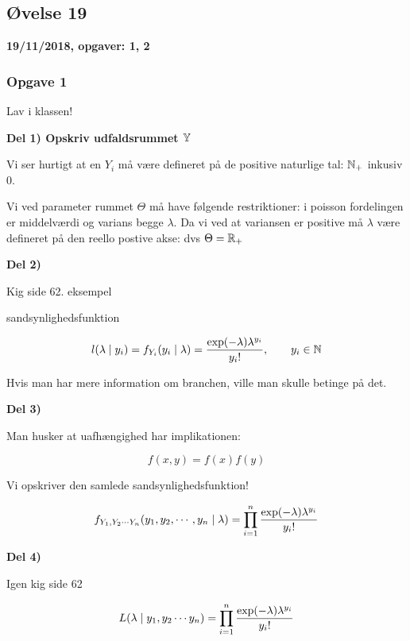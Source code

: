 \horizline

\subsection{Øvelse 19}

\textbf{19/11/2018, opgaver: 1, 2}

\subsubsection{Opgave 1}

Lav i klassen!

\textbf{Del 1) Opskriv udfaldsrummet $\mathbb{Y}$}

Vi ser hurtigt at en $Y_i$ må være defineret på de positive naturlige tal: $\mathbb{N}_+$ inkusiv 0.

Vi ved parameter rummet $\Theta$ må have følgende restriktioner: i poisson fordelingen er middelværdi og varians begge $\lambda$. Da vi ved at variansen er positive må $\lambda$ være defineret på den reello postive akse: dvs $\Theta =\mathbb{R}_+ $

\textbf{Del 2)}

Kig side 62. eksempel

sandsynlighedsfunktion

\begin{equation}
    l(\lambda \mid y_i) = f_{Y_i}(y_i \mid \lambda) = \frac{\exp(-\lambda) \lambda^{y_i}}{y_i !}, \qquad y_i \in \mathbb{N}
\end{equation}

Hvis man har mere information om branchen, ville man skulle betinge på det.

\textbf{Del 3)}

Man husker at uafhængighed har implikationen:

\begin{equation}
    f(x,y) = f(x) f(y)
\end{equation}

Vi opskriver den samlede sandsynlighedsfunktion!

\begin{equation}
    f_{Y_1, Y_2 \cdots Y_n} (y_1, y_2, \cdots, y_n \mid \lambda) = \prod_{i=1}^{n} \frac{\exp(-\lambda)\lambda^{y_i}}{y_i !}
\end{equation}


\textbf{Del 4)}

Igen kig side 62

\begin{equation}
    L(\lambda \mid y_1 ,y_2 \cdots y_{n})  =\prod_{i=1}^{n} \frac{\exp(-\lambda)\lambda^{y_i}}{y_i !}
\end{equation}


